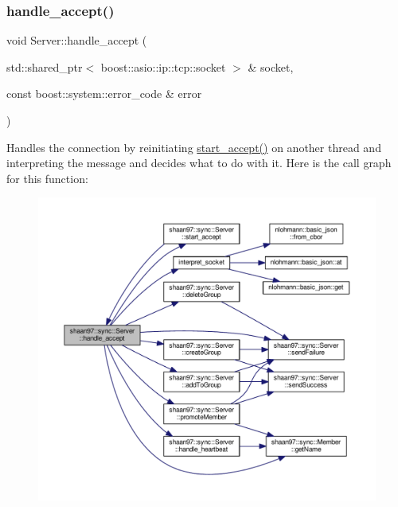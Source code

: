 \subsubsection{\texorpdfstring{handle\+\_\+accept()}{handle\_accept()}}
{\footnotesize\ttfamily void Server\+::handle\+\_\+accept (\begin{DoxyParamCaption}\item[{std\+::shared\+\_\+ptr$<$ boost\+::asio\+::ip\+::tcp\+::socket $>$ \&}]{socket,  }\item[{const boost\+::system\+::error\+\_\+code \&}]{error }\end{DoxyParamCaption})\hspace{0.3cm}{\ttfamily [private]}}

Handles the connection by reinitiating {\ttfamily \hyperlink{group___connection_handling_gab19cf3e5b775cd1b4eeb6d936340e712}{start\+\_\+accept()}} on another thread and interpreting the message and decides what to do with it. Here is the call graph for this function\+:\nopagebreak
\begin{figure}[H]
\begin{center}
\leavevmode
\includegraphics[width=350pt]{group___connection_handling_ga447569609c9d667ab509e61d1dd1b476_cgraph}
\end{center}
\end{figure}
\mbox{\label{group___connection_handling_gab19cf3e5b775cd1b4eeb6d936340e712}} 
